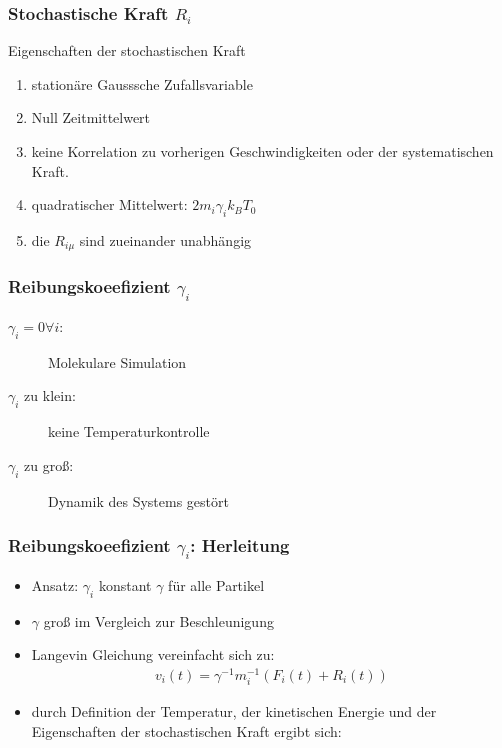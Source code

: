 \documentclass{beamer}
\begin{document}
\begin{frame}
  \frametitle{Stochastische Kraft $R_i$}
  \begin{block}{Eigenschaften der stochastischen Kraft} 
  	\begin{enumerate}
  		\item stationäre Gausssche Zufallsvariable
  		\item Null Zeitmittelwert %
  		\item keine Korrelation zu vorherigen Geschwindigkeiten oder der systematischen Kraft. 
  		\item quadratischer Mittelwert: $2 m_i \gamma_i k_B T_0$
  		\item die $R_{i \mu}$ sind zueinander unabhängig
  	\end{enumerate}
  \end{block}	
  
  
\end{frame}


\begin{frame}
	\frametitle{Reibungskoeefizient $\gamma_i$}
	\begin{description}
		\item[$\gamma_i=0 \forall i$:] Molekulare Simulation
		\item[$\gamma_i$ zu klein:] keine Temperaturkontrolle
		\item[$\gamma_i$ zu groß:] Dynamik des Systems gestört 
	\end{description}
\end{frame}


\begin{frame}
	\frametitle{Reibungskoeefizient $\gamma_i$: Herleitung}
	\begin{itemize}
	    \item Ansatz: $\gamma_i$ konstant $\gamma$ für alle Partikel
	    \item $\gamma$ groß im Vergleich zur Beschleunigung
	    \item Langevin Gleichung vereinfacht sich zu:
	    \begin{align*}
	    v_i(t) = \gamma^{-1} m_i^{-1} (F_i(t) + R_i(t) )
	    \end{align*}
	    \item durch Definition der Temperatur, der kinetischen Energie und der Eigenschaften der stochastischen Kraft ergibt sich: 
	     
	\end{itemize}
    	
\end{frame}
\end{document}
